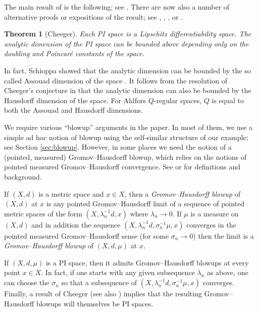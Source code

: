 \documentclass{amsart}
\theoremstyle{plain}
\newtheorem{theorem}{Theorem}
\theoremstyle{definition}
\numberwithin{equation}{section}
\numberwithin{theorem}{section}
\begin{document}
The main result of \cite{Ch} is the following; see \cite[Theorem 4.38]{Ch}. There are now also a number of alternative proofs or expositions of the result; see \cite{KeithLD},  \cite{KleinerMackay}, \cite[Ch. 13]{HKST}, or \cite[Section 10]{Bate}.
\begin{theorem}[Cheeger]\label{thm:cheeger}
Each PI space is a Lipschitz differentiability space. The analytic dimension of the PI space can be bounded above depending only on the doubling and Poincar\'e constants of the space.
\end{theorem}
In fact, Schioppa showed that the analytic dimension can be bounded by the so called Assouad dimension of the space \cite{Schioppa}. It follows from the resolution of Cheeger's conjecture in \cite{PMR} that the analytic dimension can also be bounded by the Hausdorff dimension of the space. For Ahlfors $Q$-regular spaces, $Q$ is equal to both the Assouad and Hausdorff dimensions.

We require various ``blowup'' arguments in the paper. In most of them, we use a simple ad hoc notion of blowup using the self-similar structure of our example; see Section \ref{sec:blowup}. However, in some places we need the notion of a (pointed, measured) Gromov--Hausdorff blowup, which relies on the notions of pointed measured Gromov--Hausdorff convergence. See \cite[Ch. 8]{DS} or \cite[Ch. 11]{HKST} for definitions and background.

If $(X,d)$ is a metric space and $x\in X$, then a \emph{Gromov--Hausdorff blowup} of $(X,d)$ at $x$ is any pointed Gromov--Hausdorff limit of a sequence of pointed metric spaces of the form $(X, \lambda_n^{-1}d, x)$ where $\lambda_n\rightarrow 0$. If $\mu$ is a measure on $(X,d)$ and in addition the sequence $(X, \lambda_n^{-1}d, \sigma_n^{-1}\mu, x)$ converges in the pointed measured Gromov--Hausdorff sense (for some $\sigma_n\rightarrow 0$) then the limit is a \emph{Gromov--Hausdorff blowup} of $(X,d,\mu)$ at $x$.

If $(X,d,\mu)$ is a PI space, then it admits Gromov--Hausdorff blowups at every point $x\in X$. In fact, if one starts with any given subsequence $\lambda_n$ as above, one can choose the $\sigma_n$ so that a subsequence of $(X, \lambda_n^{-1}d, \sigma_n^{-1}\mu, x)$ converges. Finally, a result of Cheeger \cite[Section 9]{Ch} (see also \cite[Ch. 11]{HKST}) implies that the resulting Gromov--Hausdorff blowups will themselves be PI spaces.
\end{document}
